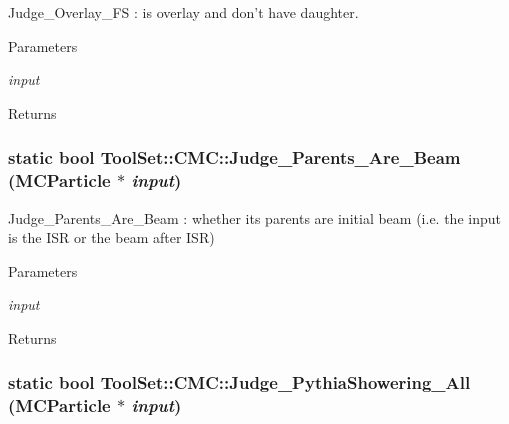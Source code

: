 Judge\_\-Overlay\_\-FS : is overlay and don't have daughter. 
\begin{DoxyParams}{Parameters}
\item[{\em input}]\end{DoxyParams}
\begin{DoxyReturn}{Returns}

\end{DoxyReturn}
\hypertarget{classToolSet_1_1CMC_a5ccf3aedd3c942ac6644748abaaf70fe}{
\subsubsection[{Judge\_\-Parents\_\-Are\_\-Beam}]{\setlength{\rightskip}{0pt plus 5cm}static bool ToolSet::CMC::Judge\_\-Parents\_\-Are\_\-Beam (MCParticle $\ast$ {\em input})}}
\label{classToolSet_1_1CMC_a5ccf3aedd3c942ac6644748abaaf70fe}


Judge\_\-Parents\_\-Are\_\-Beam : whether its parents are initial beam (i.e. the input is the ISR or the beam after ISR)


\begin{DoxyParams}{Parameters}
\item[{\em input}]\end{DoxyParams}
\begin{DoxyReturn}{Returns}

\end{DoxyReturn}
\hypertarget{classToolSet_1_1CMC_a6c340bf257a238e9f68cd251b50599cd}{
\subsubsection[{Judge\_\-PythiaShowering\_\-All}]{\setlength{\rightskip}{0pt plus 5cm}static bool ToolSet::CMC::Judge\_\-PythiaShowering\_\-All (MCParticle $\ast$ {\em input})}}
\label{classToolSet_1_1CMC_a6c340bf257a238e9f68cd251b50599cd}


